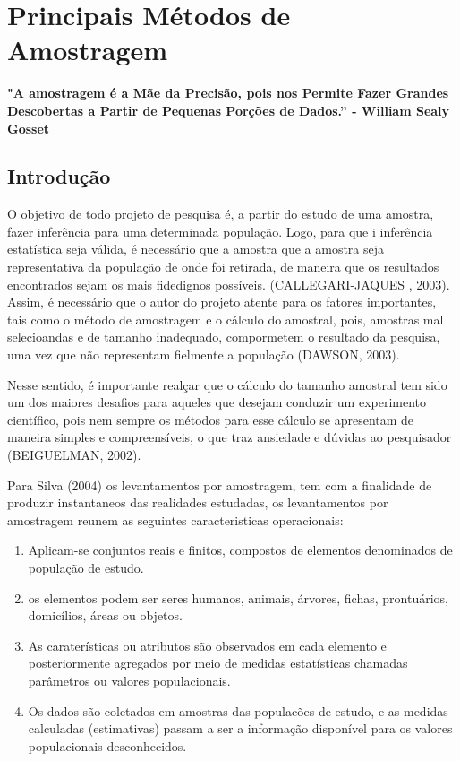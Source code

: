 \chapter{Principais Métodos de Amostragem}

\textbf{"A amostragem é a Mãe da Precisão, pois nos Permite Fazer Grandes Descobertas a Partir de Pequenas Porções de Dados.” - William Sealy Gosset} \vskip0.3cm

\section{Introdução}

O objetivo de todo projeto de pesquisa é, a partir do estudo de uma amostra, fazer inferência para uma determinada população. Logo, para que i inferência estatística seja válida, é necessário que a amostra que a amostra seja representativa da população de onde foi retirada, de maneira que os resultados encontrados sejam os mais fidedignos possíveis. (CALLEGARI-JAQUES , 2003). Assim, é necessário que o autor do projeto atente para os fatores importantes, tais como o método de amostragem e o cálculo do amostral, pois, amostras mal selecioandas e de tamanho inadequado, compormetem o resultado da pesquisa, uma vez que não representam fielmente a população (DAWSON, 2003).
\vskip0.3cm

Nesse sentido, é importante realçar que o cálculo do tamanho amostral tem sido um dos maiores desafios para aqueles que desejam conduzir um experimento científico, pois nem sempre os métodos para esse cálculo se apresentam de maneira simples e compreensíveis, o que traz ansiedade e dúvidas ao pesquisador (BEIGUELMAN, 2002).
\vskip0.3cm

Para Silva (2004) os levantamentos por amostragem, tem com a finalidade de produzir instantaneos das realidades estudadas, os levantamentos por amostragem reunem as seguintes caracteristicas operacionais:

\begin{enumerate}
    \item[{i})] Aplicam-se conjuntos reais e finitos, compostos de
    elementos denominados de população de estudo.
    \item[{ii})] os elementos podem ser seres humanos, animais, árvores,
    fichas, prontuários, domicílios, áreas ou objetos.
    \item[{iii})] As caraterísticas ou atributos são observados em cada
    elemento e posteriormente agregados por meio de medidas
    estatísticas chamadas parâmetros ou valores populacionais.
\vskip0.3cm
    \item[{iv})] Os dados são coletados em amostras das populacões de
    estudo, e as medidas calculadas (estimativas) passam a ser a
    informação disponível para os valores populacionais
    desconhecidos.
\end{enumerate}


